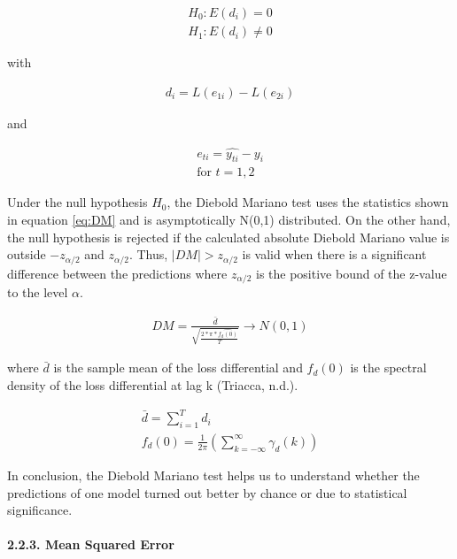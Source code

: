 \documentclass[
]{article}
\begin{document}
\begin{align} \label{eq:DM_hypothesis}
  H_{0}: E(d_{i}) = 0 \\
  H_{1}: E(d_{i}) \neq 0 \nonumber
\end{align}

with

\begin{align} \label{eq:DM_loss_diff}
  d_{i} = L(e_{1i}) - L(e_{2i})
\end{align}

and

\begin{align} \label{eq:DM_error}
  e_{ti} = \hat{y_{ti}} - y_{i} \\
  \text{for } t={1,2} \nonumber
\end{align}

Under the null hypothesis \(H_{0}\), the Diebold Mariano test uses the
statistics shown in equation \ref{eq:DM} and is asymptotically N(0,1)
distributed. On the other hand, the null hypothesis is rejected if the
calculated absolute Diebold Mariano value is outside \(-z_{\alpha/2}\)
and \(z_{\alpha/2}\). Thus, \(|DM|>z_{\alpha/2}\) is valid when there is
a significant difference between the predictions where \(z_{\alpha/2}\)
is the positive bound of the z-value to the level \(\alpha\).

\begin{align} \label{eq:DM}
  DM = \frac{\bar{d}}{\sqrt{\frac{2*\pi*\hat{f_{d}(0)}}{T}}} \rightarrow N(0,1)
\end{align}

where \(\bar{d}\) is the sample mean of the loss differential and
\(f_{d}(0)\) is the spectral density of the loss differential at lag k
(Triacca, n.d.).

\begin{align} \label{eq:DM_definitions}
  \bar{d} = \sum_{i = 1}^{T}d_{i} \\
  f_{d}(0) = \frac{1}{2\pi}(\sum_{k=-\infty}^{\infty} \gamma_{d}(k))
\end{align}

In conclusion, the Diebold Mariano test helps us to understand whether
the predictions of one model turned out better by chance or due to
statistical significance.

\newpage

\hypertarget{MSE}{%
\paragraph{2.2.3. Mean Squared Error}\label{MSE}}
\end{document}
